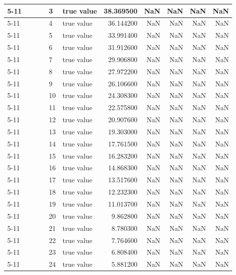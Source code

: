 \begin{tabular}{llllllrrrrr}
\cline{5-11}
 &  &  &  & 3 & true value & 38.369500 & NaN & NaN & NaN & NaN \\
\cline{5-11}
 &  &  &  & 4 & true value & 36.144200 & NaN & NaN & NaN & NaN \\
\cline{5-11}
 &  &  &  & 5 & true value & 33.991400 & NaN & NaN & NaN & NaN \\
\cline{5-11}
 &  &  &  & 6 & true value & 31.912600 & NaN & NaN & NaN & NaN \\
\cline{5-11}
 &  &  &  & 7 & true value & 29.906800 & NaN & NaN & NaN & NaN \\
\cline{5-11}
 &  &  &  & 8 & true value & 27.972200 & NaN & NaN & NaN & NaN \\
\cline{5-11}
 &  &  &  & 9 & true value & 26.106600 & NaN & NaN & NaN & NaN \\
\cline{5-11}
 &  &  &  & 10 & true value & 24.308300 & NaN & NaN & NaN & NaN \\
\cline{5-11}
 &  &  &  & 11 & true value & 22.575800 & NaN & NaN & NaN & NaN \\
\cline{5-11}
 &  &  &  & 12 & true value & 20.907600 & NaN & NaN & NaN & NaN \\
\cline{5-11}
 &  &  &  & 13 & true value & 19.303000 & NaN & NaN & NaN & NaN \\
\cline{5-11}
 &  &  &  & 14 & true value & 17.761500 & NaN & NaN & NaN & NaN \\
\cline{5-11}
 &  &  &  & 15 & true value & 16.283200 & NaN & NaN & NaN & NaN \\
\cline{5-11}
 &  &  &  & 16 & true value & 14.868300 & NaN & NaN & NaN & NaN \\
\cline{5-11}
 &  &  &  & 17 & true value & 13.517600 & NaN & NaN & NaN & NaN \\
\cline{5-11}
 &  &  &  & 18 & true value & 12.232300 & NaN & NaN & NaN & NaN \\
\cline{5-11}
 &  &  &  & 19 & true value & 11.013700 & NaN & NaN & NaN & NaN \\
\cline{5-11}
 &  &  &  & 20 & true value & 9.862800 & NaN & NaN & NaN & NaN \\
\cline{5-11}
 &  &  &  & 21 & true value & 8.780300 & NaN & NaN & NaN & NaN \\
\cline{5-11}
 &  &  &  & 22 & true value & 7.764600 & NaN & NaN & NaN & NaN \\
\cline{5-11}
 &  &  &  & 23 & true value & 6.808400 & NaN & NaN & NaN & NaN \\
\cline{5-11}
 &  &  &  & 24 & true value & 5.881200 & NaN & NaN & NaN & NaN \\

\end{tabular}
